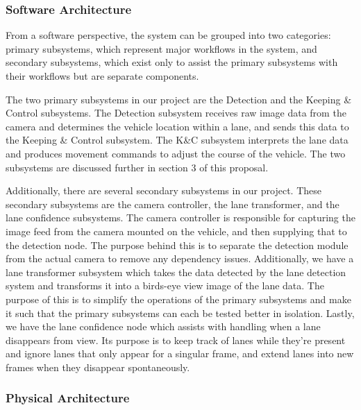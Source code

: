 \documentclass[titlepage, draft]{article}
\begin{document}
\subsubsection{Software Architecture}
From a software perspective, the system can be grouped into two categories: primary subsystems, which represent major workflows in the system, and secondary subsystems, which exist only to assist the primary subsystems with their workflows but are separate components.

The two primary subsystems in our project are the Detection and the Keeping \& Control subsystems. The Detection subsystem receives raw image data from the camera and determines the vehicle location within a lane, and sends this data to the Keeping \& Control subsystem. The K\&C subsystem interprets the lane data and produces movement commands to adjust the course of the vehicle. The two subsystems are discussed further in section 3 of this proposal.

Additionally, there are several secondary subsystems in our project. These secondary subsystems are the camera controller, the lane transformer, and the lane confidence subsystems. The camera controller is responsible for capturing the image feed from the camera mounted on the vehicle, and then supplying that to the detection node. The purpose behind this is to separate the detection module from the actual camera to remove any dependency issues. Additionally, we have a lane transformer subsystem which takes the data detected by the lane detection system and transforms it into a birds-eye view image of the lane data. The purpose of this is to simplify the operations of the primary subsystems and make it such that the primary subsystems can each be tested better in isolation. Lastly, we have the lane confidence node which assists with handling when a lane disappears from view. Its purpose is to keep track of lanes while they're present and ignore lanes that only appear for a singular frame, and extend lanes into new frames when they disappear spontaneously.

\subsubsection{Physical Architecture}
\end{document}
